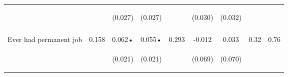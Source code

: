 \begin{table}[h!]
{\begin{tabular}{lcccccccc}
 & \begin{footnotesize}\end{footnotesize} & \begin{footnotesize}(0.027)\end{footnotesize} & \begin{footnotesize}(0.027)\end{footnotesize} & \begin{footnotesize}\end{footnotesize} & \begin{footnotesize}(0.030)\end{footnotesize} & \begin{footnotesize}(0.032)\end{footnotesize} & \begin{footnotesize}\end{footnotesize} & \begin{footnotesize}\end{footnotesize}\\
 & \begin{footnotesize}\end{footnotesize} & \begin{footnotesize}[0.021]\end{footnotesize} & \begin{footnotesize}[0.021]\end{footnotesize} & \begin{footnotesize}\end{footnotesize} & \begin{footnotesize}[0.505]\end{footnotesize} & \begin{footnotesize}[0.410]\end{footnotesize} & \begin{footnotesize}\end{footnotesize} & \begin{footnotesize}\end{footnotesize}\\
\noalign{\smallskip}Ever had permanent job & 0.158 & 0.062• & 0.055• & 0.293 & -0.012 & 0.033 & 0.32 & 0.76\\
 & \begin{footnotesize}\end{footnotesize} & \begin{footnotesize}(0.021)\end{footnotesize} & \begin{footnotesize}(0.021)\end{footnotesize} & \begin{footnotesize}\end{footnotesize} & \begin{footnotesize}(0.069)\end{footnotesize} & \begin{footnotesize}(0.070)\end{footnotesize} & \begin{footnotesize}\end{footnotesize} & \begin{footnotesize}\end{footnotesize}\\

\end{tabular}}
\end{table}

